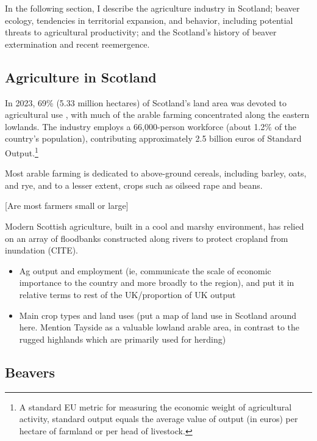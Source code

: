 
In the following section, I describe the agriculture industry in Scotland; beaver ecology, tendencies in territorial expansion, and behavior, including potential threats to agricultural productivity; and the Scotland's history of beaver extermination and recent reemergence. 

\subsection{Agriculture in Scotland}

In 2023, 69\% (5.33 million hectares) of Scotland's land area was devoted to agricultural use \citep{cabinet_secretary_for_rural_affairs_land_reform_and_islands_results_2023}, with much of the arable farming concentrated along the eastern lowlands. The industry employs a 66,000-person workforce (about 1.2\% of the country's population), contributing approximately 2.5 billion euros of Standard Output.\footnote{A standard EU metric for measuring the economic weight of agricultural activity, standard output equals the average value of output (in euros) per hectare of farmland or per head of livestock.}

Most arable farming is dedicated to above-ground cereals, including barley, oats, and rye, and to a lesser extent, crops such as oilseed rape and beans.

[Are most farmers small or large]

Modern Scottish agriculture, built in a cool and marshy environment, has relied on an array of floodbanks constructed along rivers to protect cropland from inundation (CITE).

\begin{itemize}
    \item Ag output and employment (ie, communicate the scale of economic importance to the country and more broadly to the region), and put it in relative terms to rest of the UK/proportion of UK output
    \item Main crop types and land uses (put a map of land use in Scotland around here. Mention Tayside as a valuable lowland arable area, in contrast to the rugged highlands which are primarily used for herding)
\end{itemize}

\subsection{Beavers}

